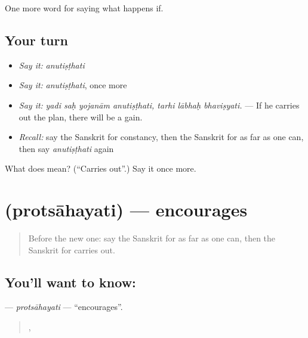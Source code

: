 \begin{grammarlens}[title={What you've built}]
One more word for saying what happens if.
\end{grammarlens}

\subsection*{Your turn}
\begin{itemize}
\raggedright
  \item \emph{Say it:} \emph{anutiṣṭhati}
  \item \emph{Say it:} \emph{anutiṣṭhati}, once more
  \item \emph{Say it:} \emph{yadi saḥ yojanām anutiṣṭhati, tarhi lābhaḥ bhaviṣyati.} — If he carries out the plan, there will be a gain.
  \item \emph{Recall:} say the Sanskrit for constancy, then the Sanskrit for as far as one can, then say \emph{anutiṣṭhati} again
\end{itemize}

\begin{tcolorbox}[breakable,colback=teal!4,colframe=teal!35!black,title={Before you move on}]
What does  mean? (\textquotedblleft{}Carries out\textquotedblright{}.) Say it once more.
\end{tcolorbox}
\section[\texorpdfstring{\sk{प्रोत्साहयति} (protsāhayati)}{प्रोत्साहयति (protsāhayati)}]{ (protsāhayati) — encourages}

\label{lesson:SA-C384-protsahayati}



\begin{quote}
Before the new one: say the Sanskrit for as far as one can, then the Sanskrit for carries out.
\end{quote}

\subsection*{You'll want to know: }
\textbf{} — \emph{protsāhayati} — \textquotedblleft{}encourages\textquotedblright{}.

\begin{quote}
  ,    
\end{quote}

